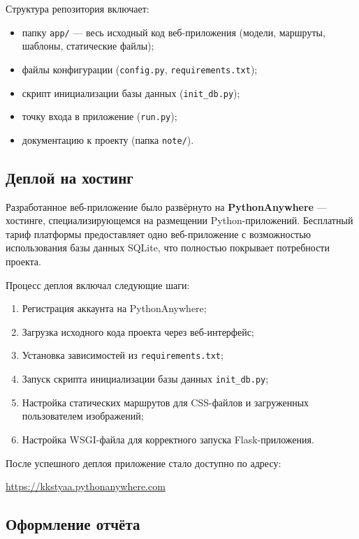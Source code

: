 \documentclass[14pt, a4paper]{extarticle}
\begin{document}
Структура репозитория включает:
\begin{itemize}
    \item папку \texttt{app/} — весь исходный код веб-приложения (модели, маршруты, шаблоны, статические файлы);
    \item файлы конфигурации (\texttt{config.py}, \texttt{requirements.txt});
    \item скрипт инициализации базы данных (\texttt{init\_db.py});
    \item точку входа в приложение (\texttt{run.py});
    \item документацию к проекту (папка \texttt{note/}).
\end{itemize}

\subsection{Деплой на хостинг}

Разработанное веб-приложение было развёрнуто на \textbf{PythonAnywhere} — хостинге, специализирующемся на размещении Python-приложений. Бесплатный тариф платформы предоставляет одно веб-приложение с возможностью использования базы данных SQLite, что полностью покрывает потребности проекта.

Процесс деплоя включал следующие шаги:
\begin{enumerate}
    \item Регистрация аккаунта на PythonAnywhere;
    \item Загрузка исходного кода проекта через веб-интерфейс;
    \item Установка зависимостей из \texttt{requirements.txt};
    \item Запуск скрипта инициализации базы данных \texttt{init\_db.py};
    \item Настройка статических маршрутов для CSS-файлов и загруженных пользователем изображений;
    \item Настройка WSGI-файла для корректного запуска Flask-приложения.
\end{enumerate}

После успешного деплоя приложение стало доступно по адресу:
\begin{center}
    \url{https://kkstyaa.pythonanywhere.com}
\end{center}

\subsection{Оформление отчёта}
\end{document}
